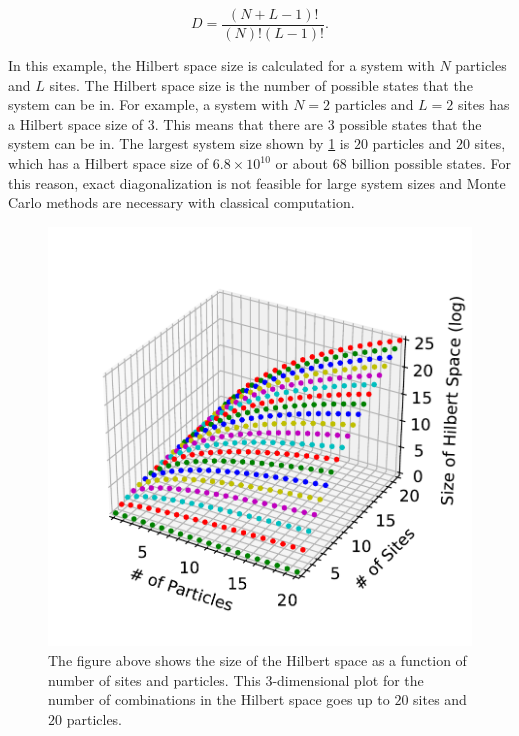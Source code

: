 \begin{equation}
D = \frac{\left(N+L-1\right)!}{\left(N\right)!\left(L-1\right)!}.
\label{eq:36}
\end{equation}

In this example, the Hilbert space size is calculated for a system with $N$ particles and $L$ sites. The Hilbert space size is the number of possible states that the system can be in. For example, a system with $N=2$ particles and $L=2$ sites has a Hilbert space size of $3$. This means that there are $3$ possible states that the system can be in. The largest system size shown by \cref{fig:hilbert_space_size} is $20$ particles and $20$ sites, which has a Hilbert space size of $6.8 \times 10^{10}$ or about 68 billion possible states. For this reason, exact diagonalization is not feasible for large system sizes and Monte Carlo methods are necessary with classical computation.

\begin{figure}[H]
\centering
\includegraphics[scale=0.5]{../figures/hilbert_space_size.pdf}
\caption{The figure above shows the size of the Hilbert space as a function of number of sites and particles. This 3-dimensional plot for the number of combinations in the Hilbert space goes up to $20$ sites and $20$ particles.}
\label{fig:hilbert_space_size}
\end{figure}

